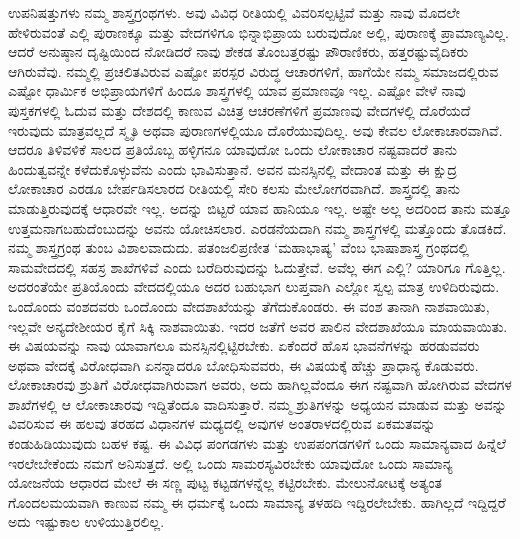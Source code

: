 ಉಪನಿಷತ್ತುಗಳು ನಮ್ಮ ಶಾಸ್ತ್ರಗ್ರಂಥಗಳು. ಅವು ವಿವಿಧ ರೀತಿಯಲ್ಲಿ ವಿವರಿಸಲ್ಪಟ್ಟಿವೆ ಮತ್ತು ನಾವು ಮೊದಲೇ ಹೇಳಿರುವಂತೆ ಎಲ್ಲಿ ಪುರಾಣಕ್ಕೂ ಮತ್ತು ವೇದಗಳಿಗೂ ಭಿನ್ನಾಭಿಪ್ರಾಯ ಬರುವುದೋ ಅಲ್ಲಿ, ಪುರಾಣಕ್ಕೆ ಪ್ರಾಮಾಣ್ಯವಿಲ್ಲ. ಆದರೆ ಅನುಷ್ಠಾನ ದೃಷ್ಟಿಯಿಂದ ನೋಡಿದರೆ ನಾವು ಶೇಕಡ ತೊಂಬತ್ತರಷ್ಟು ಪೌರಾಣಿಕರು, ಹತ್ತರಷ್ಟು\break ವೈದಿಕರು ಆಗಿರುವೆವು. ನಮ್ಮಲ್ಲಿ ಪ್ರಚಲಿತವಿರುವ ಎಷ್ಟೋ ಪರಸ್ಪರ ವಿರುದ್ಧ ಆಚಾರಗಳಿಗೆ, ಹಾಗೆಯೇ ನಮ್ಮ ಸಮಾಜದಲ್ಲಿರುವ ಎಷ್ಟೋ ಧಾರ್ಮಿಕ ಅಭಿಪ್ರಾಯಗಳಿಗೆ ಹಿಂದೂ ಶಾಸ್ತ್ರಗಳಲ್ಲಿ ಯಾವ ಪ್ರಮಾಣವೂ ಇಲ್ಲ. ಎಷ್ಟೋ ವೇಳೆ ನಾವು ಪುಸ್ತಕಗಳಲ್ಲಿ ಓದುವ ಮತ್ತು ದೇಶದಲ್ಲಿ ಕಾಣುವ ವಿಚಿತ್ರ ಆಚರಣೆಗಳಿಗೆ ಪ್ರಮಾಣವು ವೇದಗಳಲ್ಲಿ ದೊರೆಯದೆ ಇರುವುದು ಮಾತ್ರವಲ್ಲದೆ ಸ್ಮೃತಿ ಅಥವಾ ಪುರಾಣಗಳಲ್ಲಿಯೂ ದೊರೆಯುವುದಿಲ್ಲ. ಅವು ಕೇವಲ ಲೋಕಾಚಾರವಾಗಿವೆ. ಆದರೂ ತಿಳಿವಳಿಕೆ ಸಾಲದ ಪ್ರತಿಯೊಬ್ಬ ಹಳ್ಳಿಗನೂ ಯಾವುದೋ ಒಂದು ಲೋಕಾಚಾರ ನಷ್ಟವಾದರೆ ತಾನು ಹಿಂದುತ್ವವನ್ನೇ ಕಳೆದುಕೊಳ್ಳುವೆನು ಎಂದು ಭಾವಿಸುತ್ತಾನೆ. ಅವನ ಮನಸ್ಸಿನಲ್ಲಿ ವೇದಾಂತ ಮತ್ತು ಈ ಕ್ಷುದ್ರ ಲೋಕಾಚಾರ ಎರಡೂ ಬೇರ್ಪಡಿಸಲಾರದ ರೀತಿಯಲ್ಲಿ ಸೇರಿ ಕಲಸು ಮೇಲೋಗರವಾಗಿದೆ. ಶಾಸ್ತ್ರದಲ್ಲಿ ತಾನು ಮಾಡುತ್ತಿರುವುದಕ್ಕೆ ಆಧಾರವೇ ಇಲ್ಲ. ಅದನ್ನು ಬಿಟ್ಟರೆ ಯಾವ ಹಾನಿಯೂ ಇಲ್ಲ. ಅಷ್ಟೇ ಅಲ್ಲ ಅದರಿಂದ ತಾನು ಮತ್ತೂ ಉತ್ತಮನಾಗಬಹುದೆಂಬುದನ್ನು ಅವನು ಯೋಚಿಸಲಾರ. ಎರಡನೆಯದಾಗಿ ನಮ್ಮ ಶಾಸ್ತ್ರಗಳಲ್ಲಿ ಮತ್ತೊಂದು ತೊಡಕಿದೆ. ನಮ್ಮ ಶಾಸ್ತ್ರಗ್ರಂಥ ತುಂಬ ವಿಶಾಲವಾದುದು. ಪತಂಜಲಿಪ್ರಣೀತ ‘ಮಹಾಭಾಷ್ಯ’ ವೆಂಬ ಭಾಷಾಶಾಸ್ತ್ರ ಗ್ರಂಥದಲ್ಲಿ ಸಾಮವೇದದಲ್ಲಿ ಸಹಸ್ರ ಶಾಖೆಗಳಿವೆ ಎಂದು ಬರೆದಿರುವುದನ್ನು ಓದುತ್ತೇವೆ. ಅವೆಲ್ಲ ಈಗ ಎಲ್ಲಿ? ಯಾರಿಗೂ ಗೊತ್ತಿಲ್ಲ. ಅದರಂತೆಯೇ ಪ್ರತಿಯೊಂದು ವೇದದಲ್ಲಿಯೂ ಅದರ ಬಹುಭಾಗ ಲುಪ್ತವಾಗಿ ಎಲ್ಲೋ ಸ್ವಲ್ಪ ಮಾತ್ರ ಉಳಿದಿರುವುದು. ಒಂದೊಂದು ವಂಶದವರು ಒಂದೊಂದು ವೇದಶಾಖೆಯನ್ನು ತೆಗೆದುಕೊಂಡರು. ಈ ವಂಶ ತಾನಾಗಿ ನಾಶವಾಯಿತು, ಇಲ್ಲವೇ ಅನ್ಯದೇಶೀಯರ ಕೈಗೆ ಸಿಕ್ಕಿ ನಾಶವಾಯಿತು. ಇದರ ಜತೆಗೆ ಅವರ ಪಾಲಿನ ವೇದಶಾಖೆಯೂ ಮಾಯವಾಯಿತು. ಈ ವಿಷಯವನ್ನು ನಾವು ಯಾವಾಗಲೂ ಮನಸ್ಸಿನಲ್ಲಿಟ್ಟಿರಬೇಕು. ಏಕೆಂದರೆ ಹೊಸ ಭಾವನೆಗಳನ್ನು ಹರಡುವವರು ಅಥವಾ ವೇದಕ್ಕೆ ವಿರೋಧವಾಗಿ ಏನನ್ನಾದರೂ ಬೋಧಿಸುವವರು, ಈ ವಿಷಯಕ್ಕೆ ಹೆಚ್ಚು ಪ್ರಾಧಾನ್ಯ ಕೊಡುವರು. ಲೋಕಾಚಾರವು ಶ್ರುತಿಗೆ ವಿರೋಧವಾಗಿರುವಾಗ ಅವರು, ಅದು ಹಾಗಿಲ್ಲವೆಂದೂ ಈಗ ನಷ್ಟವಾಗಿ ಹೋಗಿರುವ ವೇದಗಳ ಶಾಖೆಗಳಲ್ಲಿ ಆ ಲೋಕಾಚಾರವು ಇದ್ದಿತೆಂದೂ ವಾದಿಸುತ್ತಾರೆ. ನಮ್ಮ ಶ್ರುತಿಗಳನ್ನು ಅಧ್ಯಯನ ಮಾಡುವ ಮತ್ತು ಅವನ್ನು ವಿವರಿಸುವ ಈ ಹಲವು ತರಹದ ವಿಧಾನಗಳ ಮಧ್ಯದಲ್ಲಿ ಅವುಗಳ ಅಂತರಾಳದಲ್ಲಿರುವ ಏಕಮತವನ್ನು ಕಂಡುಹಿಡಿಯುವುದು ಬಹಳ ಕಷ್ಟ. ಈ ವಿವಿಧ ಪಂಗಡಗಳು ಮತ್ತು ಉಪಪಂಗಡಗಳಿಗೆ ಒಂದು ಸಾಮಾನ್ಯವಾದ ಹಿನ್ನೆಲೆ ಇರಲೇಬೇಕೆಂದು ನಮಗೆ ಅನಿಸುತ್ತದೆ. ಅಲ್ಲಿ ಒಂದು ಸಾಮರಸ್ಯವಿರಬೇಕು ಯಾವುದೋ ಒಂದು ಸಾಮಾನ್ಯ ಯೋಜನೆಯ ಆಧಾರದ ಮೇಲೆ ಈ ಸಣ್ಣ ಪುಟ್ಟ ಕಟ್ಟಡಗಳನ್ನೆಲ್ಲ ಕಟ್ಟಿರಬೇಕು. ಮೇಲುನೋಟಕ್ಕೆ ಅತ್ಯಂತ ಗೊಂದಲಮಯವಾಗಿ ಕಾಣುವ ನಮ್ಮ ಈ ಧರ್ಮಕ್ಕೆ ಒಂದು ಸಾಮಾನ್ಯ ತಳಹದಿ ಇದ್ದಿರಲೇಬೇಕು. ಹಾಗಿಲ್ಲದೆ ಇದ್ದಿದ್ದರೆ ಅದು ಇಷ್ಟುಕಾಲ ಉಳಿಯುತ್ತಿರಲಿಲ್ಲ.

